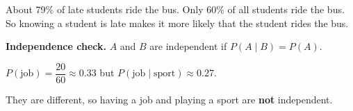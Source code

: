 \documentclass[11pt]{article}
\begin{document}
\vspace{0.7em}
About 79\% of late students ride the bus. Only 60\% of all students ride the bus. So knowing a student is late makes it more likely that the student rides the bus.

\vspace{0.8em}
\textbf{Independence check.} $A$ and $B$ are independent if $P(A \mid B) = P(A)$.

\vspace{0.2em}
$P(\text{job}) = \dfrac{20}{60} \approx 0.33$ \; but \; $P(\text{job} \mid \text{sport}) \approx 0.27$.\par\vspace{0.3em}
They are different, so having a job and playing a sport are \textbf{not} independent.

\partner
\end{document}
